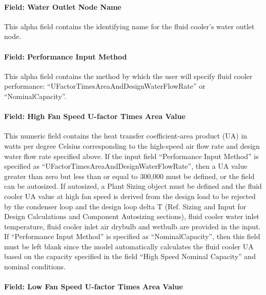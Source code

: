 \paragraph{Field: Water Outlet Node Name}\label{field-water-outlet-node-name-7}

This alpha field contains the identifying name for the fluid cooler's water outlet node.

\paragraph{Field: Performance Input Method}\label{field-performance-input-method-6}

This alpha field contains the method by which the user will specify fluid cooler performance: ``UFactorTimesAreaAndDesignWaterFlowRate'' or ``NominalCapacity''.

\paragraph{Field: High Fan Speed U-factor Times Area Value}\label{field-high-fan-speed-u-factor-times-area-value-2}

This numeric field contains the heat transfer coefficient-area product (UA) in watts per degree Celsius corresponding to the high-speed air flow rate and design water flow rate specified above. If the input field ``Performance Input Method'' is specified as ``UFactorTimesAreaAndDesignWaterFlowRate'', then a UA value greater than zero but less than or equal to 300,000 must be defined, or the field can be autosized. If autosized, a Plant Sizing object must be defined and the fluid cooler UA value at high fan speed is derived from the design load to be rejected by the condenser loop and the design loop delta T (Ref. Sizing and Input for Design Calculations and Component Autosizing sections), fluid cooler water inlet temperature, fluid cooler inlet air drybulb and wetbulb are provided in the input. If ``Performance Input Method'' is specified as ``NominalCapacity'', then this field must be left blank since the model automatically calculates the fluid cooler UA based on the capacity specified in the field ``High Speed Nominal Capacity'' and nominal conditions.

\paragraph{Field: Low Fan Speed U-factor Times Area Value}\label{field-low-fan-speed-u-factor-times-area-value-2}

